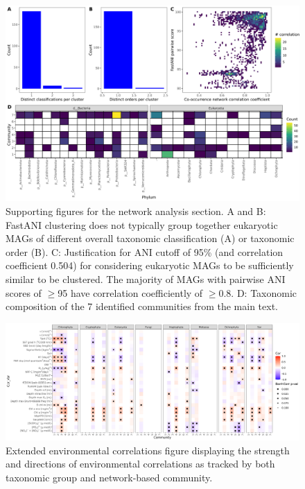 \documentclass[12pt]{article}
\numberwithin{equation}{section}
\begin{document}
\begin{landscape}
    \begin{figure}
        \centering
        \includegraphics[width=0.95\columnwidth]{si-figures/network_supporting.png}
        \caption{Supporting figures for the network analysis section. A and B: FastANI clustering does not typically group together eukaryotic MAGs of different overall taxonomic classification (A) or taxonomic order (B). C: Justification for ANI cutoff of 95\% (and correlation coefficient 0.504) for considering eukaryotic MAGs to be sufficiently similar to be clustered. The majority of MAGs with pairwise ANI scores of $\geq$95 have correlation coefficiently of $\geq$0.8. D: Taxonomic composition of the 7 identified communities from the main text.}
        \label{fig:network-support}
    \end{figure}
\end{landscape}

\begin{landscape}
    \begin{figure}
        \centering
        \includegraphics[width=0.95\columnwidth]{si-figures/bygroup.png}
        \caption{Extended environmental correlations figure displaying the strength and directions of environmental correlations as tracked by both taxonomic group and network-based community.}
        \label{fig:network-bygroup}
    \end{figure}
\end{landscape}
\end{document}
